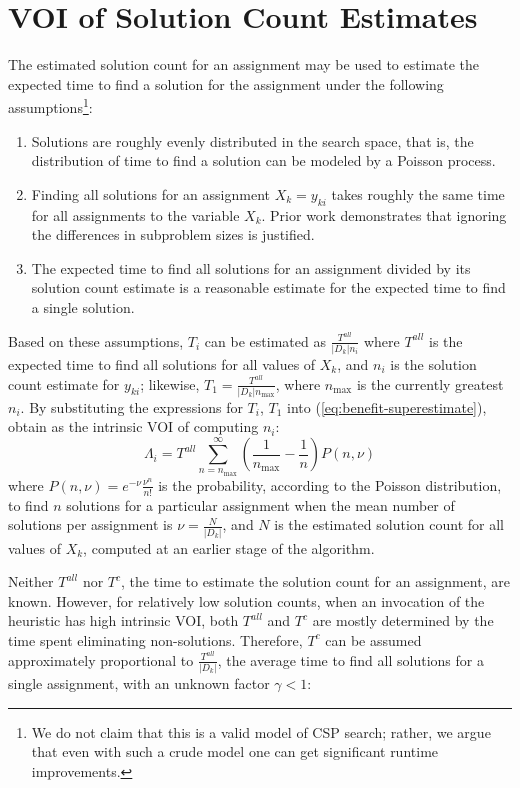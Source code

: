 \section{VOI of Solution Count Estimates}
\label{sec:csp-rational}

The estimated solution count for an assignment may be used to estimate
the expected time to find a solution for the assignment under the
following assumptions\footnote{We do not claim
that this is a valid model of CSP search; rather, we argue that even with such a crude model
one can get significant runtime improvements.}:
\begin{enumerate}
\item Solutions are roughly evenly distributed in the search space, that is,
   the distribution of time to find a solution can be modeled by a
   Poisson process.
\item Finding all solutions for an assignment $X_{k}=y_{ki}$
takes roughly the same time for all assignments to the variable $X_k$. Prior work
   \cite{Meisels.solcount,Kask.solcount} demonstrates that
   ignoring the differences in subproblem sizes is justified.
\item The expected time to find all solutions for an assignment
  divided by its solution count estimate is a
  reasonable estimate for the expected time to find a single solution. 
\end{enumerate}
Based on these assumptions, $T_i$ can be estimated as $\frac {T^{all}}
{|D_k|n_i}$ where $T^{all}$ is the expected time to find all
solutions for all values of $X_k$, and $n_i$ is the
solution count estimate for $y_{ki}$; likewise, $T_1=\frac
{T^{all}} {|D_k|n_\mathrm{max}}$, where $n_\mathrm{max}$ is the currently
greatest $n_i$.  By substituting the expressions for
$T_i$, $T_1$ into (\ref{eq:benefit-superestimate}), obtain
as the intrinsic VOI of computing $n_i$:
\begin{equation}
\label{eq:benefit-estimate-sc}
\Lambda_i=T^{all} \sum_{n=n_\mathrm{max}}^\infty\left(
  \frac 1 {n_\mathrm{max}} - \frac 1 n\right) P(n, \nu)
\end{equation}
where $P(n, \nu)=e^{-\nu}\frac {\nu^n} {n!}$ is the probability,
according to the Poisson distribution, to find $n$ solutions for a
particular assignment when the mean number of solutions per assignment
is $\nu=\frac N {|D_k|}$, and $N$ is the estimated solution count for
all values of $X_k$, computed at an earlier stage of the algorithm.

Neither $T^{all}$ nor $T^c$, the time to estimate the solution count
for an assignment, are known. However, for relatively low solution
counts, when an invocation of the heuristic has high intrinsic VOI, both
$T^{all}$ and $T^c$ are mostly determined by the time spent eliminating
non-solutions. Therefore, $T^c$ can be assumed approximately proportional
to $\frac {T^{all}} {|D_k|}$, the average time to find all solutions
for a single assignment, with an unknown factor $\gamma < 1$:

